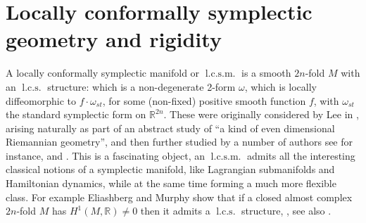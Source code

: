 \documentclass{amsart}
\numberwithin{equation}{section}
\theoremstyle{definition}
\theoremstyle{remark}
\DeclareMathOperator{\lcs}{l.c.s.}
\DeclareMathOperator{\lcsm}{l.c.s.m.}
\begin{document}
\section {Locally conformally symplectic geometry and rigidity} A locally conformally symplectic manifold or $\lcsm$ is a smooth $2n$-fold $M$ with an $\lcs$ structure: which is a
non-degenerate 2-form $\omega$, which is locally diffeomorphic to $
{f} \cdot \omega _{st}  $, for some (non-fixed) positive smooth function $f$, with $\omega _{st}  $ the standard symplectic form on
$\mathbb{R} ^{2n} $.
These
were originally considered by Lee
in \cite{citeLee}, arising naturally as part of an abstract study of
``a kind of even dimensional Riemannian geometry'', and then further studied by
a number of authors see for instance, \cite{citeBanyagaConformal} and
\cite{citeVaismanConformal}.
This is a
fascinating object,  an $\lcsm$ admits all the interesting classical notions of
a symplectic manifold, like Lagrangian submanifolds and Hamiltonian
dynamics, while at the same time forming a much more
flexible class. For example Eliashberg and Murphy show that if a
closed almost complex $2n$-fold $M$ has $H ^{1} (M, \mathbb{R}) \neq 0
$ then it admits a $\lcs$ structure,
\cite{citeEliashbergMurphyMakingcobordisms}, see
also \cite{citeMurphyConformalsymp}.  
\end{document}
